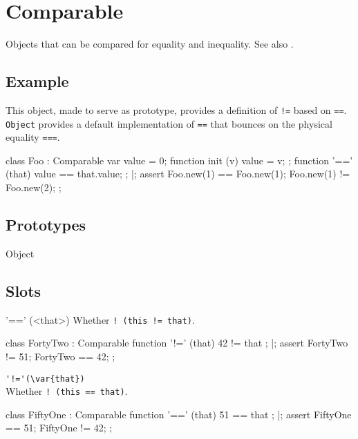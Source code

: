 
\section{Comparable}
Objects that can be compared for equality and inequality.  See also
.

\subsection{Example}
This object, made to serve as prototype, provides a definition of
\lstinline{!=} based on \lstinline{==}.  \lstinline{Object} provides a
default implementation of \lstinline{==} that bounces on the physical
equality \lstinline{===}.

\begin{urbiscript}[firstnumber=1]
class Foo : Comparable
{
  var value = 0;
  function init (v)    { value = v; };
  function '==' (that) { value == that.value; };
}|;
assert
{
  Foo.new(1) == Foo.new(1);
  Foo.new(1) != Foo.new(2);
};
\end{urbiscript}

\subsection{Prototypes}
\begin{refObjects}
\item[Object]
\end{refObjects}


\subsection{Slots}

\begin{urbiscriptapi}
\item['=='](<that>)
  Whether \lstinline|! (this != that)|.
\begin{urbiscript}
class FortyTwo : Comparable
{
  function '!=' (that) { 42 != that };
}|;
assert
{
  FortyTwo != 51;
  FortyTwo == 42;
};
\end{urbiscript}


\item \lstinline+'!='(\var{that})+\\%
  Whether \lstinline|! (this == that)|.

\begin{urbiscript}
class FiftyOne : Comparable
{
  function '==' (that) { 51 == that };
}|;
assert
{
  FiftyOne == 51;
  FiftyOne != 42;
};
\end{urbiscript}
\end{urbiscriptapi}

